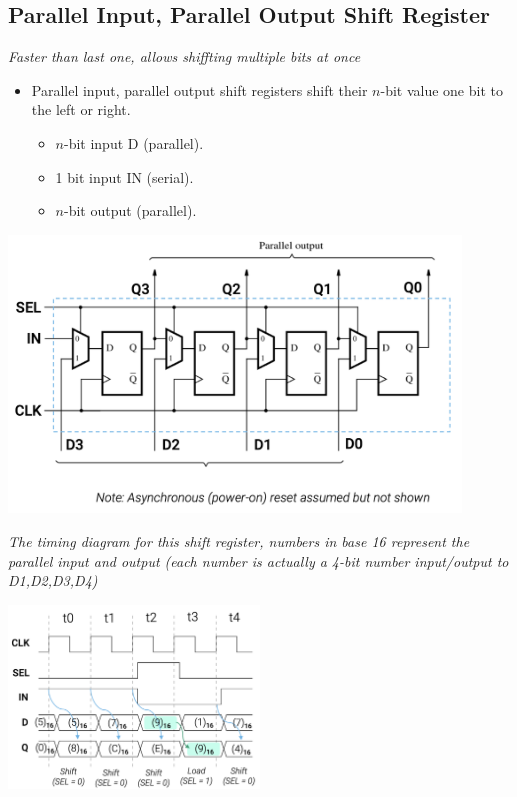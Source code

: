 \documentclass[12pt,openany]{book}
\begin{document}
\subsection{Parallel Input, Parallel Output Shift Register}
\textit{Faster than last one, allows shiffting multiple bits at once }\newline
\vspace*{10px}
\begin{minipage}{0.4\textwidth}
	\begin{itemize}
		\item[] Parallel input, parallel output shift registers shift their \(n\)-bit value one bit to the left or right.
		\begin{itemize}
			\item \(n\)-bit input D (parallel).
			\item 1 bit input IN (serial).
			\item \(n\)-bit output (parallel).
		\end{itemize}
	\end{itemize}
\end{minipage}
\hfill
\vline
\hfill
\begin{minipage}{0.5\textwidth}
	\includegraphics[width=0.9\textwidth]{circuits/14.3.2.png}
\end{minipage}
\newline
\textit{The timing diagram for this shift register, numbers in base 16 represent the parallel input and output (each number is actually a 4-bit number input/output to D1,D2,D3,D4)}

\begin{center}
	\includegraphics[width=0.5\textwidth]{circuits/14.3.2_2.png}
\end{center}
\newpage
\end{document}

